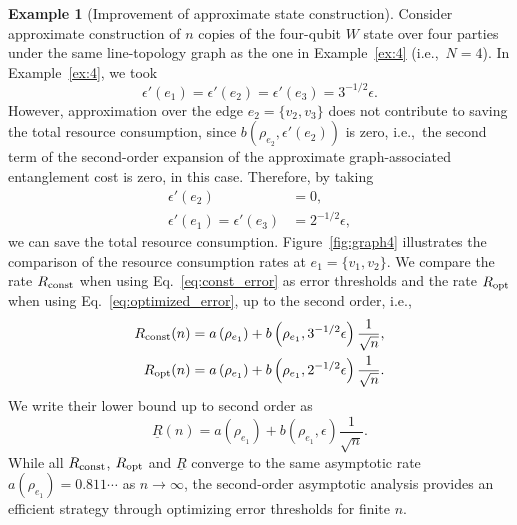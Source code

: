 \documentclass[preprintnumbers,aps,amsmath,amssymb,pra,twocolumn,showpacs,superscriptaddress,floatfix]{revtex4-1}
\theoremstyle{plain}
\theoremstyle{definition}
\newtheorem{example}{Example}
\theoremstyle{remark}
\begin{document}
\begin{example}[Improvement of approximate state construction]
  Consider approximate construction of $n$ copies of the four-qubit $W$ state over four parties under the same line-topology graph as the one in Example~\ref{ex:4} (i.e.,\ $N=4$).  In Example~\ref{ex:4}, we took
    \begin{equation}
        \epsilon'(e_1)=\epsilon'(e_2)=\epsilon'(e_3)=3^{-1/2}\epsilon.
        \label{eq:const_error}
    \end{equation}
    However, approximation over the edge $e_2=\{v_2,v_3\}$ does not contribute to saving the total resource consumption, since $b\left(\rho_{e_2},\epsilon'(e_2)\right)$ is zero, i.e.,\ the second term of the second-order expansion of the approximate graph-associated entanglement cost is zero, in this case.
Therefore, by taking
\begin{equation}
    \begin{split}
        \epsilon'\left(e_2\right)&=0,\\
        \epsilon'\left(e_1\right)=\epsilon'\left(e_3\right)&=2^{-1/2}\epsilon,
    \end{split}
    \label{eq:optimized_error}
\end{equation}
we can save the total resource consumption.
Figure~\ref{fig:graph4} illustrates the comparison of the resource consumption rates at $e_1=\{v_1,v_2\}$.
We compare the rate $R_{\textup{const}}$ when using Eq.~\eqref{eq:const_error} as error thresholds and the rate $R_{\textup{opt}}$ when using Eq.~\eqref{eq:optimized_error}, up to the second order, i.e.,\
\begin{equation*}
    \begin{split}
        R_{\textup{const}}(n)&=a\left(\rho_{e_1}\right)+b\left(\rho_{e_1},3^{-1/2}\epsilon\right)\frac{1}{\sqrt{n}},\\
        R_{\textup{opt}}(n)&=a\left(\rho_{e_1}\right)+b\left(\rho_{e_1},2^{-1/2}\epsilon\right)\frac{1}{\sqrt{n}}.
    \end{split}
\end{equation*}
We write their lower bound up to second order as
\[
    \underline{R}(n)=a\left(\rho_{e_1}\right)+b\left(\rho_{e_1},\epsilon\right)\frac{1}{\sqrt{n}}.
\]
While all $R_{\textup{const}}$, $R_{\textup{opt}}$ and $\underline{R}$ converge to the same asymptotic rate $a\left(\rho_{e_1}\right)=0.811\cdots$ as $n\to \infty$,
the second-order asymptotic analysis provides an efficient strategy through optimizing error thresholds for finite $n$.

\end{example}
\end{document}
